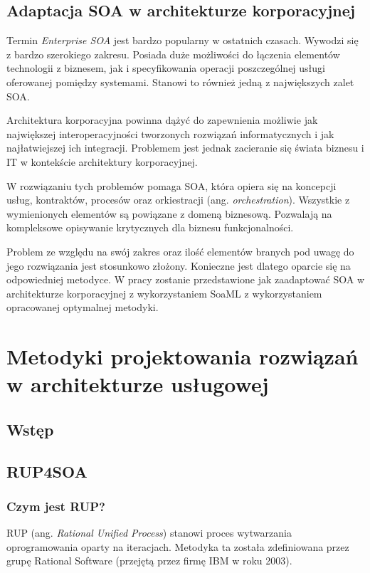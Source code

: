 \section{Adaptacja SOA w architekturze korporacyjnej}
Termin \emph{Enterprise SOA} jest bardzo popularny w ostatnich czasach. Wywodzi się z bardzo szerokiego zakresu. Posiada duże możliwości do łączenia elementów technologii z biznesem, jak i specyfikowania operacji poszczególnej usługi oferowanej pomiędzy systemami. Stanowi to również jedną z największych zalet SOA.\cite{EntSOACoryCanSoaML}

Architektura korporacyjna powinna dążyć do zapewnienia możliwie jak największej interoperacyjności tworzonych rozwiązań informatycznych i jak najłatwiejszej ich integracji. Problemem jest jednak zacieranie się świata biznesu i IT w kontekście architektury korporacyjnej.

W rozwiązaniu tych problemów pomaga SOA, która opiera się na koncepcji usług, kontraktów, procesów oraz orkiestracji (ang. \emph{orchestration}). Wszystkie z wymienionych elementów są powiązane z domeną biznesową. Pozwalają na kompleksowe opisywanie krytycznych dla biznesu funkcjonalności. 

Problem ze względu na swój zakres oraz ilość elementów branych pod uwagę do jego rozwiązania jest stosunkowo złożony. Konieczne jest dlatego oparcie się na odpowiedniej metodyce. W pracy zostanie przedstawione jak zaadaptować SOA w architekturze korporacyjnej z wykorzystaniem SoaML z wykorzystaniem opracowanej optymalnej metodyki.

\chapter{Metodyki projektowania rozwiązań w architekturze usługowej}

\section{Wstęp}

\section{RUP4SOA}
\subsection{Czym jest RUP?}
RUP (ang. \textit{Rational Unified Process}) stanowi proces  wytwarzania oprogramowania oparty na iteracjach. Metodyka ta została zdefiniowana przez grupę Rational Software (przejętą przez firmę IBM w roku 2003). 

